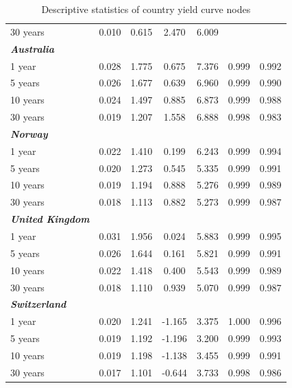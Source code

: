 \documentclass[12pt,bibliography=totoc]{article}
\begin{document}
{\begin{appendices}
\begin{table}[H]
\begin{tabular}{l c c c c c c}
30 years	&	0.010	&	0.615	&	2.470	&	6.009	&		&		\\
\textbf{\textit{Australia}}	&		&		&		&		&		&		\\
1 year	&	0.028	&	1.775	&	0.675	&	7.376	&	0.999	&	0.992	\\
5 years	&	0.026	&	1.677	&	0.639	&	6.960	&	0.999	&	0.990	\\
10 years	&	0.024	&	1.497	&	0.885	&	6.873	&	0.999	&	0.988	\\
												
30 years	&	0.019	&	1.207	&	1.558	&	6.888	&	0.998	&	0.983	\\
\textbf{\textit{Norway}}	&		&		&		&		&		&		\\
1 year	&	0.022	&	1.410	&	0.199	&	6.243	&	0.999	&	0.994	\\
5 years	&	0.020	&	1.273	&	0.545	&	5.335	&	0.999	&	0.991	\\
10 years	&	0.019	&	1.194	&	0.888	&	5.276	&	0.999	&	0.989	\\
												
30 years	&	0.018	&	1.113	&	0.882	&	5.273	&	0.999	&	0.987	\\
\textbf{\textit{United Kingdom}}	&		&		&		&		&		&		\\
1 year	&	0.031	&	1.956	&	0.024	&	5.883	&	0.999	&	0.995	\\
5 years	&	0.026	&	1.644	&	0.161	&	5.821	&	0.999	&	0.991	\\
10 years	&	0.022	&	1.418	&	0.400	&	5.543	&	0.999	&	0.989	\\
												
30 years	&	0.018	&	1.110	&	0.939	&	5.070	&	0.999	&	0.987	\\
\textbf{\textit{Switzerland}}	&		&		&		&		&		&		\\
1 year	&	0.020	&	1.241	&	-1.165	&	3.375	&	1.000	&	0.996	\\
5 years	&	0.019	&	1.192	&	-1.196	&	3.200	&	0.999	&	0.993	\\
10 years	&	0.019	&	1.198	&	-1.138	&	3.455	&	0.999	&	0.991	\\
30 years	&	0.017	&	1.101	&	-0.644	&	3.733	&	0.998	&	0.986	\\

\hline%
\end{tabular}
\label{table:nonlin}%
\caption{Descriptive statistics of country yield curve nodes}%
\end{table}


\end{appendices}}
\end{document}
